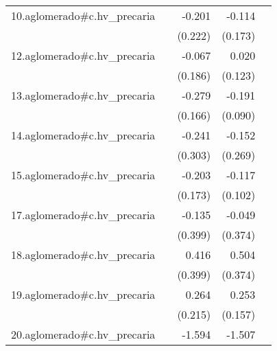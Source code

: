 {\begin{longtable}{l*{4}{D{.}{.}{-1}}}
\addlinespace
10.aglomerado#c.hv\_precaria&                     &      -0.201         &      -0.114         &                     \\
            &                     &     (0.222)         &     (0.173)         &                     \\
\addlinespace
12.aglomerado#c.hv\_precaria&                     &      -0.067         &       0.020         &                     \\
            &                     &     (0.186)         &     (0.123)         &                     \\
\addlinespace
13.aglomerado#c.hv\_precaria&                     &      -0.279         &      -0.191\sym{*}  &                     \\
            &                     &     (0.166)         &     (0.090)         &                     \\
\addlinespace
14.aglomerado#c.hv\_precaria&                     &      -0.241         &      -0.152         &                     \\
            &                     &     (0.303)         &     (0.269)         &                     \\
\addlinespace
15.aglomerado#c.hv\_precaria&                     &      -0.203         &      -0.117         &                     \\
            &                     &     (0.173)         &     (0.102)         &                     \\
\addlinespace
17.aglomerado#c.hv\_precaria&                     &      -0.135         &      -0.049         &                     \\
            &                     &     (0.399)         &     (0.374)         &                     \\
\addlinespace
18.aglomerado#c.hv\_precaria&                     &       0.416         &       0.504         &                     \\
            &                     &     (0.399)         &     (0.374)         &                     \\
\addlinespace
19.aglomerado#c.hv\_precaria&                     &       0.264         &       0.253         &                     \\
            &                     &     (0.215)         &     (0.157)         &                     \\
\addlinespace
20.aglomerado#c.hv\_precaria&                     &      -1.594\sym{**} &      -1.507\sym{**} &                     \\

\end{longtable}}
